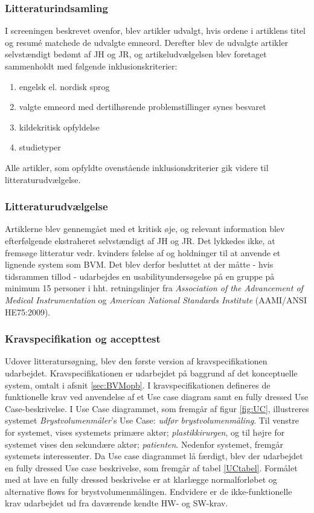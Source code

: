 	\subsubsection{Litteraturindsamling}
	I screeningen beskrevet ovenfor, blev artikler udvalgt, hvis ordene i artiklens titel og resumé matchede de udvalgte emneord. Derefter blev de udvalgte artikler selvstændigt bedømt af JH og JR, og artikeludvælgelsen blev foretaget sammenholdt med følgende inklusionskriterier:
	
		\begin{enumerate}
			\item engelsk el. nordisk sprog 
			\item valgte emneord med dertilhørende problemstillinger synes besvaret
			\item kildekritisk opfyldelse
			\item studietyper
		\end{enumerate} 
		
	Alle artikler, som opfyldte ovenstående inklusionskriterier gik videre til litteraturudvælgelse. 	
		
	\subsubsection{Litteraturudvælgelse}	
	Artiklerne blev gennemgået med et kritisk øje, og relevant information blev efterfølgende ekstraheret selvstændigt af JH og JR. Det lykkedes ikke, at fremsøge litteratur vedr. kvinders følelse af og holdninger til at anvende et lignende system som BVM. Det blev derfor besluttet at der måtte - hvis tidsrammen tillod - udarbejdes en usabilityundersøgelse på en gruppe på minimum 15 personer i hht. retningslinjer fra \textit{Association of the Advancement of Medical Instrumentation} og \textit{American National Standards Institute} (AAMI/ANSI HE75:2009). \\
	
	\subsubsection{Kravspecifikation og accepttest} 
	Udover litteratursøgning, blev den første version af kravspecifikationen udarbejdet. Kravspecifikationen er udarbejdet på baggrund af det konceptuelle system, omtalt i afsnit \ref{sec:BVMopb}. I kravspecifikationen defineres de funktionelle krav ved anvendelse af et Use case diagram samt en fully dressed Use Case-beskrivelse. I Use Case diagrammet, som fremgår af figur \ref{fig:UC}, illustreres systemet \textit{Brystvolumenmåler}'s Use Case: \textit{udfør brystvolumenmåling}. Til venstre for systemet, vises systemets primære aktør; \textit{plastikkirurgen}, og til højre for systemet vises den sekundære aktør; \textit{patienten}. Nedenfor systemet, fremgår systemets interessenter. Da Use case diagrammet lå færdigt, blev der udarbejdet en fully dressed Use case beskrivelse, som fremgår af tabel \ref{UCtabel}.
	 Formålet med at lave en fully dressed beskrivelse er at klarlægge normalforløbet og alternative flows for brystvolumenmålingen. Endvidere er de ikke-funktionelle krav udarbejdet ud fra daværende kendte HW- og SW-krav.
	 
